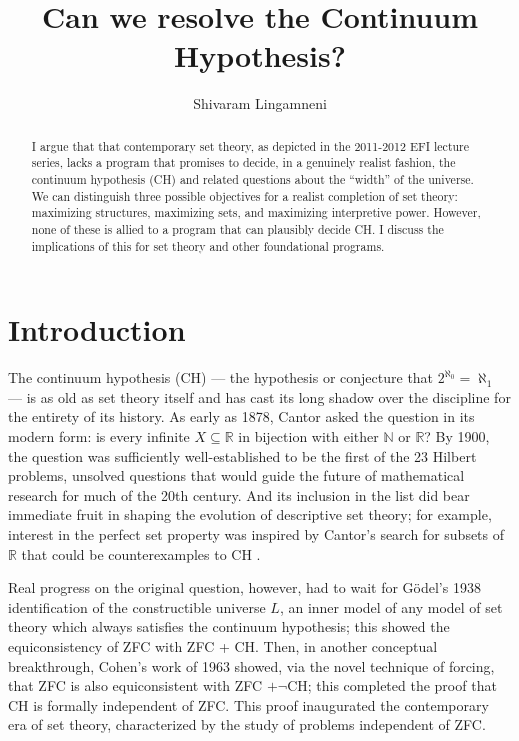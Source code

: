 \documentclass[letterpaper,12pt]{article}
\newcommand{\N}{\mathbb{N}}
\newcommand{\R}{\mathbb{R}}
\begin{document}


\title{Can we resolve the Continuum Hypothesis?}
\author{Shivaram Lingamneni}
\maketitle


\begin{abstract}
I argue that that contemporary set theory, as depicted in the 2011-2012 EFI lecture series, lacks a program that promises to decide, in a genuinely realist fashion, the continuum hypothesis (CH) and related questions about the ``width'' of the universe. We can distinguish three possible objectives for a realist completion of set theory: maximizing structures, maximizing sets, and maximizing interpretive power. However, none of these is allied to a program that can plausibly decide CH. I discuss the implications of this for set theory and other foundational programs.
\end{abstract}

\section{Introduction}
The continuum hypothesis (CH) --- the hypothesis or conjecture that $2^{\aleph_0} = \aleph_1$ --- is as old as set theory itself and has cast its long shadow over the discipline for the entirety of its history. As early as 1878, Cantor asked the question in its modern form: is every infinite $X \subseteq \R$ in bijection with either $\N$ or $\R$? By 1900, the question was sufficiently well-established to be the first of the 23 Hilbert problems, unsolved questions that would guide the future of mathematical research for much of the 20th century. And its inclusion in the list did bear immediate fruit in shaping the evolution of descriptive set theory; for example, interest in the perfect set property was inspired by Cantor's search for subsets of $\mathbb{R}$ that could be counterexamples to CH \citep{kanamori2008higher}.

Real progress on the original question, however, had to wait for G\"odel's 1938 identification of the constructible universe $L$, an inner model of any model of set theory which always satisfies the continuum hypothesis; this showed the equiconsistency of ZFC with ZFC + CH. Then, in another conceptual breakthrough, Cohen's work of 1963 showed, via the novel technique of forcing, that ZFC is also equiconsistent with ZFC $+ \neg \mathrm{CH}$; this completed the proof that CH is formally independent of ZFC. This proof inaugurated the contemporary era of set theory, characterized by the study of problems independent of ZFC.
\end{document}
